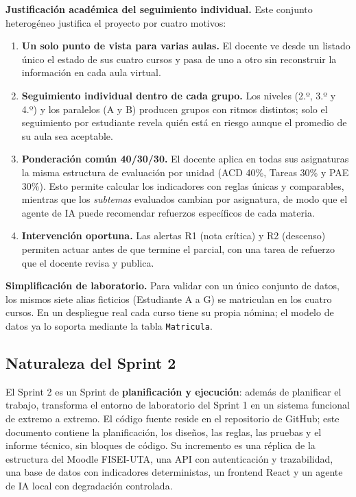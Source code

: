 \documentclass[11pt,a4paper]{article}
\begin{document}
\textbf{Justificación académica del seguimiento individual.} Este conjunto heterogéneo justifica el proyecto por cuatro motivos:
\begin{enumerate}
  \item \textbf{Un solo punto de vista para varias aulas.} El docente ve desde un listado único el estado de sus cuatro cursos y pasa de uno a otro sin reconstruir la información en cada aula virtual.
  \item \textbf{Seguimiento individual dentro de cada grupo.} Los niveles (2.º, 3.º y 4.º) y los paralelos (A y B) producen grupos con ritmos distintos; solo el seguimiento por estudiante revela quién está en riesgo aunque el promedio de su aula sea aceptable.
  \item \textbf{Ponderación común 40/30/30.} El docente aplica en todas sus asignaturas la misma estructura de evaluación por unidad (ACD 40\%, Tareas 30\% y PAE 30\%). Esto permite calcular los indicadores con reglas únicas y comparables, mientras que los \emph{subtemas} evaluados cambian por asignatura, de modo que el agente de IA puede recomendar refuerzos específicos de cada materia.
  \item \textbf{Intervención oportuna.} Las alertas R1 (nota crítica) y R2 (descenso) permiten actuar antes de que termine el parcial, con una tarea de refuerzo que el docente revisa y publica.
\end{enumerate}
\textbf{Simplificación de laboratorio.} Para validar con un único conjunto de datos, los mismos siete alias ficticios (Estudiante A a G) se matriculan en los cuatro cursos. En un despliegue real cada curso tiene su propia nómina; el modelo de datos ya lo soporta mediante la tabla \texttt{Matricula}.

\subsection{Naturaleza del Sprint 2}
El Sprint 2 es un Sprint de \textbf{planificación y ejecución}: además de planificar el trabajo, transforma el entorno de laboratorio del Sprint 1 en un sistema funcional de extremo a extremo. El código fuente reside en el repositorio de GitHub; este documento contiene la planificación, los diseños, las reglas, las pruebas y el informe técnico, sin bloques de código. Su incremento es una réplica de la estructura del Moodle FISEI-UTA, una API con autenticación y trazabilidad, una base de datos con indicadores deterministas, un frontend React y un agente de IA local con degradación controlada.
\end{document}
